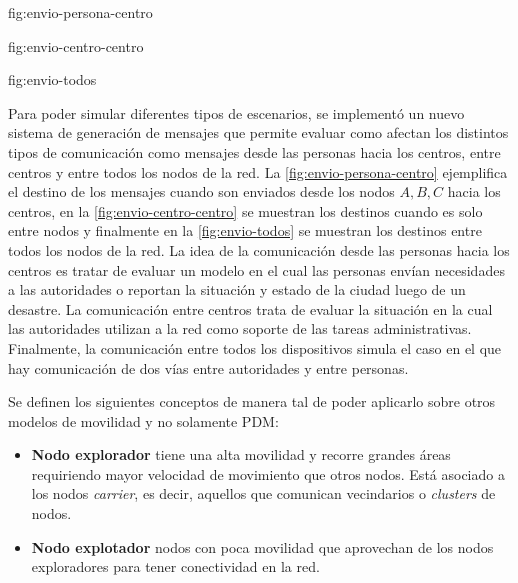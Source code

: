 {}{fig:envio-persona-centro}

{}{fig:envio-centro-centro}

{}{fig:envio-todos}

Para poder simular diferentes tipos de escenarios, se implementó un nuevo
sistema de generación de mensajes que permite evaluar como afectan los distintos
tipos de comunicación como mensajes desde las personas hacia los centros, entre
centros y entre todos los nodos de la red. La \ref{fig:envio-persona-centro}
ejemplifica el destino de los mensajes cuando son enviados desde los nodos $A,
B, C$ hacia los centros, en la \ref{fig:envio-centro-centro} se muestran los
destinos cuando es solo entre nodos y finalmente en la \ref{fig:envio-todos} se
muestran los destinos entre todos los nodos de la red. La idea de la
comunicación desde las personas hacia los centros es tratar de evaluar un modelo
en el cual las personas envían necesidades a las autoridades o reportan la
situación y estado de la ciudad luego de un desastre. La comunicación entre
centros trata de evaluar la situación en la cual las autoridades utilizan a la
red como soporte de las tareas administrativas. Finalmente, la comunicación entre
todos los dispositivos simula el caso en el que hay comunicación de dos vías
entre autoridades y entre personas.

Se definen los siguientes conceptos de manera tal de poder aplicarlo sobre otros
modelos de movilidad y no solamente PDM:

\begin{itemize}
  \item \textbf{Nodo explorador} tiene una alta movilidad y recorre grandes áreas
  requiriendo mayor velocidad de movimiento que otros nodos. Está asociado a los
  nodos \textit{carrier}, es decir, aquellos que comunican vecindarios o
  \textit{clusters} de nodos.
  \item \textbf{Nodo explotador} nodos con poca movilidad que aprovechan de los
  nodos exploradores para tener conectividad en la red.
\end{itemize}



